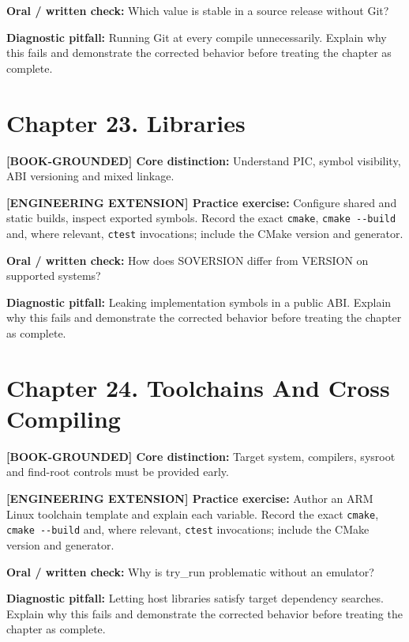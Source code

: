 \documentclass[11pt,letterpaper,oneside]{report}
\providecommand{\passthrough}[1]{#1}
\begin{document}
\textbf{Oral / written check:} Which value is stable in a source release
without Git?

\textbf{Diagnostic pitfall:} Running Git at every compile unnecessarily.
Explain why this fails and demonstrate the corrected behavior before
treating the chapter as complete.

\section{Chapter 23. Libraries}\label{chapter-23.-libraries}

\textbf{{[}BOOK-GROUNDED{]} Core distinction:} Understand PIC, symbol
visibility, ABI versioning and mixed linkage.

\textbf{{[}ENGINEERING EXTENSION{]} Practice exercise:} Configure shared
and static builds, inspect exported symbols. Record the exact
\passthrough{\lstinline!cmake!}, \passthrough{\lstinline!cmake --build!}
and, where relevant, \passthrough{\lstinline!ctest!} invocations;
include the CMake version and generator.

\textbf{Oral / written check:} How does SOVERSION differ from VERSION on
supported systems?

\textbf{Diagnostic pitfall:} Leaking implementation symbols in a public
ABI. Explain why this fails and demonstrate the corrected behavior
before treating the chapter as complete.

\section{Chapter 24. Toolchains And Cross
Compiling}\label{chapter-24.-toolchains-and-cross-compiling}

\textbf{{[}BOOK-GROUNDED{]} Core distinction:} Target system, compilers,
sysroot and find-root controls must be provided early.

\textbf{{[}ENGINEERING EXTENSION{]} Practice exercise:} Author an ARM
Linux toolchain template and explain each variable. Record the exact
\passthrough{\lstinline!cmake!}, \passthrough{\lstinline!cmake --build!}
and, where relevant, \passthrough{\lstinline!ctest!} invocations;
include the CMake version and generator.

\textbf{Oral / written check:} Why is try\_run problematic without an
emulator?

\textbf{Diagnostic pitfall:} Letting host libraries satisfy target
dependency searches. Explain why this fails and demonstrate the
corrected behavior before treating the chapter as complete.
\end{document}
